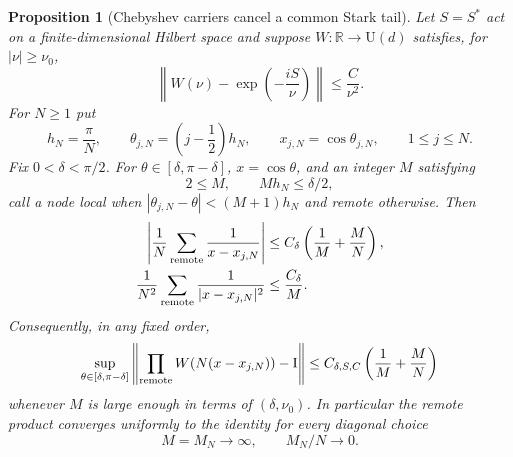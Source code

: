 \documentclass[11pt]{article}
\newtheorem{proposition}[theorem]{Proposition}
\theoremstyle{remark}
\newcommand{\Id}{\mathrm I}
\begin{document}
\begin{proposition}[Chebyshev carriers cancel a common Stark tail]
\label{prop:chebyshev-stark-cancellation}
Let $S=S^*$ act on a finite-dimensional Hilbert space and suppose
$W:\mathbb R\to\mathrm U(d)$ satisfies, for $|\nu|\geq\nu_0$,
\begin{equation}
 \left\|W(\nu)-\exp\!\left(-\frac{iS}{\nu}\right)\right\|
 \leq\frac{C}{\nu^2}.
 \label{eq:common-stark-log-tail}
\end{equation}
For $N\geq1$ put
\[
 h_N=\frac{\pi}{N},\qquad
 \theta_{j,N}=\left(j-\frac12\right)h_N,\qquad
 x_{j,N}=\cos\theta_{j,N},\qquad 1\leq j\leq N.
\]
Fix $0<\delta<\pi/2$.  For
$\theta\in[\delta,\pi-\delta]$, $x=\cos\theta$, and an integer $M$ satisfying
\begin{equation}
 2\leq M,\qquad Mh_N\leq\delta/2,
 \label{eq:chebyshev-cluster-scale}
\end{equation}
call a node local when
$|\theta_{j,N}-\theta|<(M+1)h_N$ and remote otherwise.  Then
\begin{align}
 \left|
  \frac1N\sum_{\rm remote}\frac1{x-x_{j,N}}
 \right|
 &\leq C_\delta\left(\frac1M+\frac{M}{N}\right),
 \label{eq:truncated-chebyshev-cauchy}\\
 \frac1{N^2}\sum_{\rm remote}
 \frac1{|x-x_{j,N}|^2}
 &\leq\frac{C_\delta}{M}.
 \label{eq:truncated-chebyshev-square}
\end{align}
Consequently, in any fixed order,
\begin{equation}
 \sup_{\theta\in[\delta,\pi-\delta]}
 \left\|
  \prod_{\rm remote}
  W\!\left(N(x-x_{j,N})\right)-\Id
 \right\|
 \leq
 C_{\delta,S,C}
 \left(\frac1M+\frac{M}{N}\right)
 \label{eq:chebyshev-remote-product}
\end{equation}
whenever $M$ is large enough in terms of $(\delta,\nu_0)$.
In particular the remote product converges uniformly to the identity for
every diagonal choice
\[
 M=M_N\longrightarrow\infty,
 \qquad
 M_N/N\longrightarrow0.
\]
\end{proposition}
\end{document}
